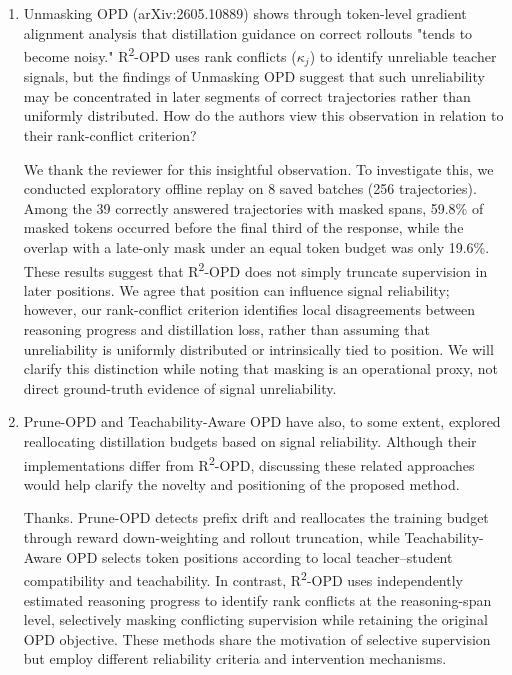\begin{enumerate}
\item Unmasking OPD (arXiv:2605.10889) shows through token-level gradient alignment analysis that distillation guidance on correct rollouts "tends to become noisy." R\textsuperscript{2}-OPD uses rank conflicts ($\kappa_j$) to identify unreliable teacher signals, but the findings of Unmasking OPD suggest that such unreliability may be concentrated in later segments of correct trajectories rather than uniformly distributed. How do the authors view this observation in relation to their rank-conflict criterion?
\par{}
\begin{responsebox}[frametitle={Response to W4}]
We thank the reviewer for this insightful observation. To investigate this, we conducted exploratory offline replay on 8 saved batches (256 trajectories). Among the 39 correctly answered trajectories with masked spans, 59.8\% of masked tokens occurred before the final third of the response, while the overlap with a late-only mask under an equal token budget was only 19.6\%. These results suggest that R\textsuperscript{2}-OPD does not simply truncate supervision in later positions. We agree that position can influence signal reliability; however, our rank-conflict criterion identifies local disagreements between reasoning progress and distillation loss, rather than assuming that unreliability is uniformly distributed or intrinsically tied to position. We will clarify this distinction while noting that masking is an operational proxy, not direct ground-truth evidence of signal unreliability.
\end{responsebox}

\item Prune-OPD and Teachability-Aware OPD have also, to some extent, explored reallocating distillation budgets based on signal reliability. Although their implementations differ from R\textsuperscript{2}-OPD, discussing these related approaches would help clarify the novelty and positioning of the proposed method.
\par{}
\begin{responsebox}[frametitle={Response to W5}]
Thanks. Prune-OPD detects prefix drift and reallocates the training budget through reward down-weighting and rollout truncation, while Teachability-Aware OPD selects token positions according to local teacher--student compatibility and teachability. In contrast, R\textsuperscript{2}-OPD uses independently estimated reasoning progress to identify rank conflicts at the reasoning-span level, selectively masking conflicting supervision while retaining the original OPD objective. These methods share the motivation of selective supervision but employ different reliability criteria and intervention mechanisms.


\end{responsebox}
\end{enumerate}

